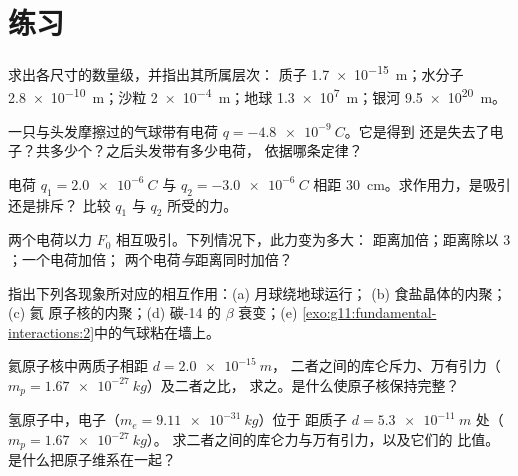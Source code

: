 \section{练习}

\begin{exercise}[$\star$]\label{exo:g11:fundamental-interactions:1}
求出各尺寸的数量级，并指出其所属层次：
质子 \qty{1.7e-15}{m}；水分子 \qty{2.8e-10}{m}；沙粒
\qty{2e-4}{m}；地球 \qty{1.3e7}{m}；银河 \qty{9.5e20}{m}。
\end{exercise}

\begin{exercise}[$\star$]\label{exo:g11:fundamental-interactions:2}
一只与头发摩擦过的气球带有电荷 $q = \qty{-4.8e-9}{C}$。它是得到
还是失去了电子？共多少个？之后头发带有多少电荷，
依据哪条定律？
\end{exercise}

\begin{exercise}[$\star$]\label{exo:g11:fundamental-interactions:3}
电荷 $q_1 = \qty{+2.0e-6}{C}$ 与 $q_2 = \qty{-3.0e-6}{C}$ 相距
\qty{30}{cm}。求作用力，是吸引还是排斥？
比较 $q_1$ 与 $q_2$ 所受的力。
\end{exercise}

\begin{exercise}[$\star$]\label{exo:g11:fundamental-interactions:4}
两个电荷以力 $F_0$ 相互吸引。下列情况下，此力变为多大：
距离加倍；距离除以 $3$；一个电荷加倍；
两个电荷\emph{与}距离同时加倍？
\end{exercise}

\begin{exercise}[$\star$]\label{exo:g11:fundamental-interactions:5}
指出下列各现象所对应的相互作用：(a) 月球绕地球运行；
(b) 食盐晶体的内聚；(c) 氦
原子核的内聚；(d) 碳-14 的 $\beta$ 衰变；(e)
\cref{exo:g11:fundamental-interactions:2}中的气球粘在墙上。
\end{exercise}

\begin{exercise}[$\star\star$]\label{exo:g11:fundamental-interactions:6}
氦原子核中两质子相距 $d = \qty{2.0e-15}{m}$，
二者之间的库仑斥力、万有引力（$m_p = \qty{1.67e-27}{kg}$）及二者之比，
求之。是什么使原子核保持完整？
\end{exercise}

\begin{exercise}[$\star\star$]\label{exo:g11:fundamental-interactions:7}
氢原子中，电子（$m_e = \qty{9.11e-31}{kg}$）位于
距质子 $d = \qty{5.3e-11}{m}$ 处（$m_p = \qty{1.67e-27}{kg}$）。
求二者之间的库仑力与万有引力，以及它们的
比值。是什么把原子维系在一起？
\end{exercise}

